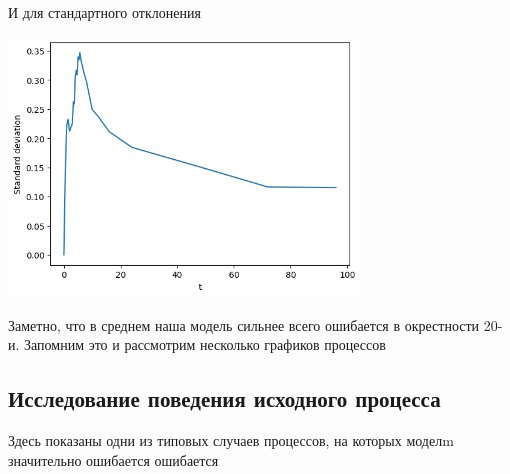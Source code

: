 \documentclass{article}
\begin{document}
И для стандартного отклонения

\includegraphics[width=0.7\textwidth, left]{std.png}

Заметно, что в среднем наша модель сильнее всего ошибается в окрестности 20-и. Запомним это и рассмотрим несколько графиков процессов

\subsection{Исследование поведения исходного процесса}

Здесь показаны одни из типовых случаев процессов, на которых моделm значительно ошибается ошибается
\end{document}
